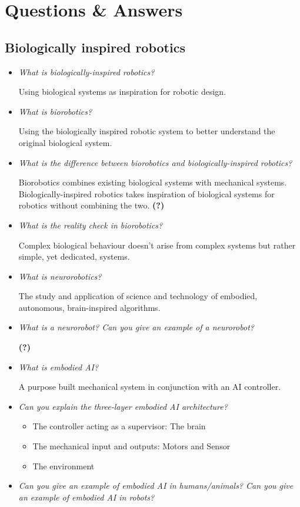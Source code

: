 \documentclass[
    fontsize      = 11pt,
    paper         = a4,
    twoside       = false,
    parskip       = half,
    pagesize      = false,
]{scrartcl}
\author{Robin Prillwitz}
\date{13. August 2022}
\providecommand{\tightlist}{%
  \setlength{\itemsep}{0pt}\setlength{\parskip}{0pt}}
\begin{document}
\hypertarget{questions-answers}{%
\section{Questions \& Answers}\label{questions-answers}}

\hypertarget{biologically-inspired-robotics}{%
\subsection{Biologically inspired
robotics}\label{biologically-inspired-robotics}}

\begin{itemize}
\item
  \emph{What is biologically-inspired robotics?}

  Using biological systems as inspiration for robotic design.
\item
  \emph{What is biorobotics?}

  Using the biologically inspired robotic system to better understand
  the original biological system.
\item
  \emph{What is the difference between biorobotics and
  biologically-inspired robotics?}

  Biorobotics combines existing biological systems with mechanical
  systems. Biologically-inspired robotics takes inspiration of
  biological systems for robotics without combining the two.
  \textbf{(?)}
\item
  \emph{What is the reality check in biorobotics?}

  Complex biological behaviour doesn't arise from complex systems but
  rather simple, yet dedicated, systems.
\item
  \emph{What is neurorobotics?}

  The study and application of science and technology of embodied,
  autonomous, brain-inspired algorithms.
\item
  \emph{What is a neurorobot? Can you give an example of a neurorobot?}

  \textbf{(?)}
\item
  \emph{What is embodied AI?}

  A purpose built mechanical system in conjunction with an AI
  controller.
\item
  \emph{Can you explain the three-layer embodied AI architecture?}

  \begin{itemize}
  \tightlist
  \item
    The controller acting as a supervisor: The brain
  \item
    The mechanical input and outputs: Motors and Sensor
  \item
    The environment
  \end{itemize}
\item
  \emph{Can you give an example of embodied AI in humans/animals? Can
  you give an example of embodied AI in robots?}


\end{itemize}
\end{document}
